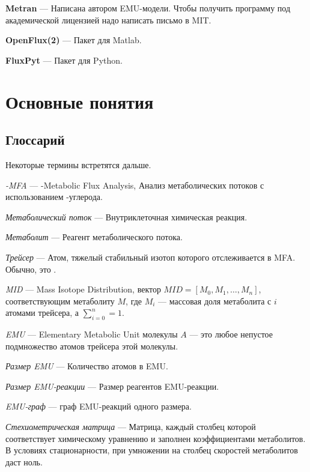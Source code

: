 \documentclass[a4paper, 12pt, left=30mm, right=15mm, top=20mm, bottom=20mm]{report}
\begin{document}
\textbf{Metran} --- Написана автором EMU-модели. Чтобы получить программу под академической лицензией надо написать письмо в MIT.

\textbf{OpenFlux(2)} --- Пакет для Matlab\cite{OpenFlux, OpenFlux2}.

\textbf{FluxPyt} --- Пакет для Python\cite{FluxPyt}.


\chapter{Основные понятия}
\section{Глоссарий}
Некоторые термины встретятся дальше.

\emph{-MFA} --- -Metabolic Flux Analysis, Анализ метаболических потоков с использованием -углерода.

\emph{Метаболический поток} --- Внутриклеточная химическая реакция.

\emph{Метаболит} --- Реагент метаболического потока.

\emph{Трейсер} --- Атом, тяжелый стабильный изотоп которого отслеживается в MFA. Обычно, это .

\emph{MID} --- Mass Isotope Distribution, вектор $M\!I\!D = [M_0, M_1, \ldots, M_n]$, соответствующим метаболиту $M$, где $M_i$ --- массовая доля метаболита с $i$ атомами трейсера, а $\sum_{i = 0}^{n} = 1$.

\emph{EMU} --- Elementary Metabolic Unit молекулы $A$ --- это любое непустое подмножество атомов трейсера этой молекулы.

\emph{Размер EMU} --- Количество атомов в EMU.

\emph{Размер EMU-реакции} --- Размер реагентов EMU-реакции.

\emph{EMU-граф} --- граф EMU-реакций одного размера.

\emph{Стехиометрическая матрица} --- Матрица, каждый столбец которой соответствует химическому уравнению и заполнен коэффициентами метаболитов. В условиях стационарности, при умножении на столбец скоростей метаболитов даст ноль.

\clearpage
\end{document}
